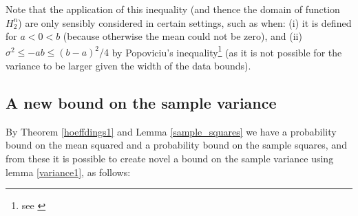 Note that the application of this inequality (and thence the domain of function $H_2^n$) are only sensibly considered in certain settings, such as when:
(i) it is defined for $a<0<b$ (because otherwise the mean could not be zero), and (ii) $\sigma^2\le-ab\le (b-a)^2/4$ by Popoviciu's inequality\footnote{see \cite{zbMATH05780164}} (as it is not possible for the variance to be larger given the width of the data bounds).



\subsection{A new bound on the sample variance}\label{subsection:sample_variance_bound}

By Theorem \ref{hoeffdings1} and Lemma \ref{sample_squares} we have a probability bound on the mean squared and a probability bound on the sample squares, and from these it is possible to create novel a bound on the sample variance using lemma \ref{variance1}, as follows:



